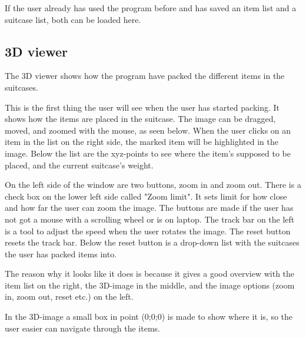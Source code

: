 If the user already has used the program before and has saved an item list and a suitcase list, both can be loaded here.

\subsection{3D viewer}
The 3D viewer shows how the program have packed the different items in the suitcases.


This is the first thing the user will see when the user has started packing. It shows how the items are placed in the suitcase.
The image can be dragged, moved, and zoomed with the mouse, as seen below. When the user clicks on an item in the list on the right side, the marked item will be highlighted in the image. Below the list are the xyz-points to see where the item's supposed to be placed, and the current suitcase's weight. 


On the left side of the window are two buttons, zoom in and zoom out. There is a check box on the lower left side called "Zoom limit". It sets limit for how close and how far the user can zoom the image. The buttons are made if the user has not got a mouse with a scrolling wheel or is on laptop. The track bar on the left is a tool to adjust the speed when the user rotates the image. The reset button resets the track bar. Below the reset button is a drop-down list with the suitcases the user has packed items into.

The reason why it looks like it does is because it gives a good overview with the item list on the right, the 3D-image in the middle, and the image options (zoom in, zoom out, reset etc.) on the left.

In the 3D-image a small box in point (0;0;0) is made to show where it is, so the user easier can navigate through the items.